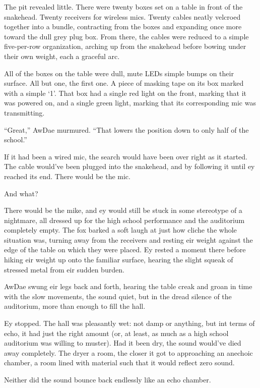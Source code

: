 \secdiv

The pit revealed little. There were twenty boxes set on a table in front of the snakehead. Twenty receivers for wireless mics. Twenty cables neatly velcroed together into a bundle, contracting from the boxes and expanding once more toward the dull grey plug box. From there, the cables were reduced to a simple five-per-row organization, arching up from the snakehead before bowing under their own weight, each a graceful arc.

All of the boxes on the table were dull, mute LEDs simple bumps on their surface. All but one, the first one. A piece of masking tape on its box marked with a simple `1'. That box had a single red light on the front, marking that it was powered on, and a single green light, marking that its corresponding mic was transmitting.

``Great,'' AwDae murmured. ``That lowers the position down to only half of the school.''

If it had been a wired mic, the search would have been over right as it started. The cable would've been plugged into the snakehead, and by following it until ey reached its end. There would be the mic.

And what?

There would be the mike, and ey would still be stuck in some stereotype of a nightmare, all dressed up for the high school performance and the auditorium completely empty. The fox barked a soft laugh at just how cliche the whole situation was, turning away from the receivers and resting eir weight against the edge of the table on which they were placed. Ey rested a moment there before hiking eir weight up onto the familiar surface, hearing the slight squeak of stressed metal from eir sudden burden.

AwDae swung eir legs back and forth, hearing the table creak and groan in time with the slow movements, the sound quiet, but in the dread silence of the auditorium, more than enough to fill the hall.

Ey stopped. The hall was pleasantly wet: not damp or anything, but int terms of echo, it had just the right amount (or, at least, as much as a high school auditorium was willing to muster). Had it been dry, the sound would've died away completely. The dryer a room, the closer it got to approaching an anechoic chamber, a room lined with material such that it would reflect zero sound.

Neither did the sound bounce back endlessly like an echo chamber.

